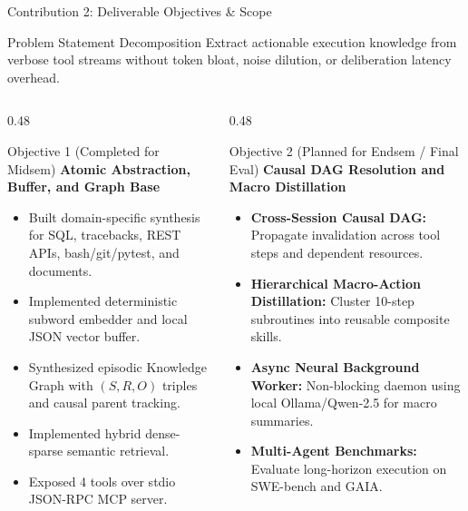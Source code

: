 \documentclass[aspectratio=169,10pt]{beamer}
\begin{document}
\begin{frame}{Contribution 2: Deliverable Objectives \& Scope}
  \begin{block}{Problem Statement Decomposition}
    Extract actionable execution knowledge from verbose tool streams without token bloat, noise dilution, or deliberation latency overhead.
  \end{block}
  \vspace{0.3em}
  \begin{columns}[T,onlytextwidth]
    \begin{column}{0.48\textwidth}
      \begin{block}{Objective 1 (Completed for Midsem)}
        \textbf{Atomic Abstraction, Buffer, and Graph Base}
        \begin{itemize}
          \footnotesize
          \item Built domain-specific synthesis for SQL, tracebacks, REST APIs, bash/git/pytest, and documents.
          \item Implemented deterministic subword embedder and local JSON vector buffer.
          \item Synthesized episodic Knowledge Graph with $(S, R, O)$ triples and causal parent tracking.
          \item Implemented hybrid dense-sparse semantic retrieval.
          \item Exposed 4 tools over stdio JSON-RPC MCP server.
        \end{itemize}
      \end{block}
    \end{column}
    \begin{column}{0.48\textwidth}
      \begin{block}{Objective 2 (Planned for Endsem / Final Eval)}
        \textbf{Causal DAG Resolution and Macro Distillation}
        \begin{itemize}
          \footnotesize
          \item \textbf{Cross-Session Causal DAG:} Propagate invalidation across tool steps and dependent resources.
          \item \textbf{Hierarchical Macro-Action Distillation:} Cluster 10-step subroutines into reusable composite skills.
          \item \textbf{Async Neural Background Worker:} Non-blocking daemon using local Ollama/Qwen-2.5 for macro summaries.
          \item \textbf{Multi-Agent Benchmarks:} Evaluate long-horizon execution on SWE-bench and GAIA.
        \end{itemize}
      \end{block}
    \end{column}
  \end{columns}
\end{frame}
\end{document}
